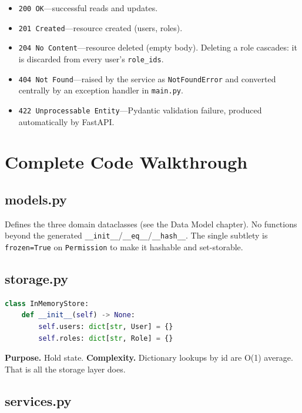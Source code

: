 \documentclass[11pt,a4paper]{report}
\begin{document}
\begin{itemize}[leftmargin=1.4em]
  \item \texttt{200 OK}---successful reads and updates.
  \item \texttt{201 Created}---resource created (users, roles).
  \item \texttt{204 No Content}---resource deleted (empty body). Deleting a role
        cascades: it is discarded from every user's \texttt{role\_ids}.
  \item \texttt{404 Not Found}---raised by the service as \texttt{NotFoundError}
        and converted centrally by an exception handler in \texttt{main.py}.
  \item \texttt{422 Unprocessable Entity}---Pydantic validation failure,
        produced automatically by FastAPI.
\end{itemize}

\chapter{Complete Code Walkthrough}

\section{models.py}

Defines the three domain dataclasses (see the Data Model chapter). No functions
beyond the generated \texttt{\_\_init\_\_}/\texttt{\_\_eq\_\_}/\texttt{\_\_hash\_\_}.
The single subtlety is \texttt{frozen=True} on \texttt{Permission} to make it
hashable and set-storable.

\section{storage.py}

\begin{lstlisting}[language=Python]
class InMemoryStore:
    def __init__(self) -> None:
        self.users: dict[str, User] = {}
        self.roles: dict[str, Role] = {}
\end{lstlisting}

\textbf{Purpose.} Hold state. \textbf{Complexity.} Dictionary lookups by id are
O(1) average. That is all the storage layer does.

\section{services.py}
\end{document}
